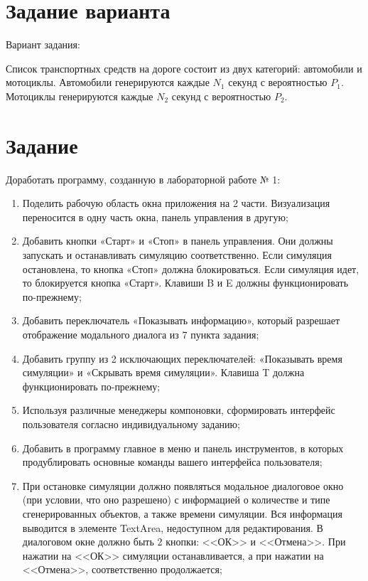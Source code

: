 \documentclass{article}
\begin{document}
\section*{Задание варианта}

Вариант задания:

Список транспортных средств на дороге состоит из двух категорий: автомобили и мотоциклы. Автомобили генерируются каждые $N_{1}$ секунд с вероятностью $P_{1}$. Мотоциклы генерируются каждые $N_{2}$ секунд с вероятностью $P_{2}$.

\section*{Задание}

Доработать программу, созданную в лабораторной работе № 1:
\begin{enumerate}

\item Поделить рабочую область окна приложения на 2 части. Визуализация переносится в одну часть окна, панель управления в другую;

\item Добавить кнопки «Старт» и «Стоп» в панель управления. Они должны запускать и останавливать симуляцию соответственно. Если симуляция остановлена, то кнопка «Стоп» должна блокироваться. Если симуляция идет, то блокируется кнопка «Старт». Клавиши B и E должны функционировать по-прежнему;

\item Добавить переключатель «Показывать информацию», который разрешает отображение модального диалога из 7 пункта задания;

\item Добавить группу из 2 исключающих переключателей: «Показывать время симуляции» и «Скрывать время симуляции». Клавиша T должна функционировать по-прежнему;

\item Используя различные менеджеры компоновки, сформировать интерфейс пользователя согласно индивидуальному заданию;

\item Добавить в программу главное в меню и панель инструментов, в которых продублировать основные команды вашего интерфейса пользователя;

\item При остановке симуляции должно появляться модальное диалоговое окно (при условии, что оно разрешено) с информацией о количестве и типе сгенерированных объектов, а также времени симуляции. Вся информация выводится в элементе TextArea, недоступном для редактирования. В диалоговом окне должно быть 2 кнопки: <<ОК>> и <<Отмена>>. При нажатии на <<ОК>> симуляции останавливается, а при нажатии на <<Отмена>>, соответственно продолжается;


\end{enumerate}
\end{document}
